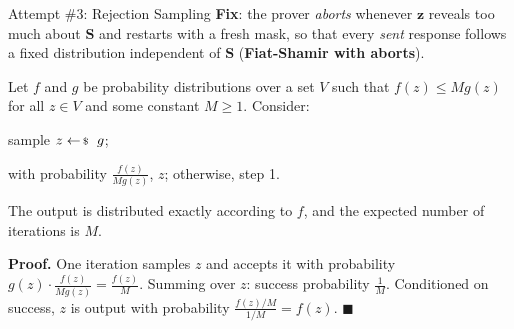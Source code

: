 \documentclass{zkdl-presentation-template}
\begin{document}
    \begin{frame}{Attempt \#3: Rejection Sampling}
        \textbf{Fix}: the prover \emph{aborts} whenever $\mathbf{z}$ reveals too much about $\mathbf{S}$ and restarts with a fresh mask, so that every \emph{sent} response follows a fixed distribution independent of $\mathbf{S}$ (\textbf{Fiat-Shamir with aborts}).
        \pause

        \begin{lemma}
            Let $f$ and $g$ be probability distributions over a set $V$ such that $f(z) \leq M g(z)$ for all $z \in V$ and some constant $M \geq 1$. Consider:
            \begin{algoen}
                \item sample $z \leftarrowS g$;
                \item with probability $\frac{f(z)}{Mg(z)}$,  $z$; otherwise,  step 1.
            \end{algoen}
            The output is distributed exactly according to $f$, and the expected number of iterations is $M$.
        \end{lemma}
        \pause

        \textbf{Proof.} One iteration samples $z$ and accepts it with probability $g(z) \cdot \frac{f(z)}{Mg(z)} = \frac{f(z)}{M}$. Summing over $z$: success probability $\frac{1}{M}$. Conditioned on success, $z$ is output with probability $\frac{f(z)/M}{1/M} = f(z)$. \hfill $\blacksquare$
    \end{frame}
\end{document}
